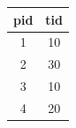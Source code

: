 \begin{tabular}{|c|c|}
\hline
pid & tid \\ \hline
1 & 10 \\
2 & 30 \\
3 & 10 \\
4 & 20 \\ \hline
\end{tabular}
